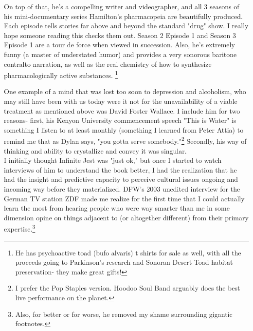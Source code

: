 On top of that, he's a compelling writer and videographer, and all 3 seasons of his mini-documentary series Hamilton's pharmacopeia are beautifully produced. Each episode tells stories far above and beyond the standard "drug" show. I really hope someone reading this checks them out. Season 2 Episode 1 and Season 3 Episode 1 are a tour de force when viewed in succession. Also, he's extremely funny (a master of understated humor) and provides a very sonorous baritone contralto narration, as well as the real chemistry of how to synthesize pharmacologically active substances. \footnote{He has psychoactive toad (bufo alvaris) t shirts for sale as well, with all the proceeds going to Parkinson's research and Sonoran Desert Toad habitat preservation- they make great gifts!}

One example of a mind that was lost too soon to depression and alcoholism, who may still have been with us today were it not for the unavailability of a viable treatment as mentioned above was David Foster Wallace. I include him for two reasons- first, his Kenyon University commencement speech "This is Water" is something I listen to at least monthly (something I learned from Peter Attia) to remind me that as Dylan says, "you gotta serve somebody."\footnote{I prefer the Pop Staples version. Hoodoo Soul Band arguably does the best live performance on the planet.} Secondly, his way of thinking and ability to crystallize and convey it was singular.\\

I initially thought Infinite Jest was "just ok," but once I started to watch interviews of him to understand the book better, I had the realization that he had the insight and predictive capacity to perceive cultural issues ongoing and incoming way before they materialized. DFW's 2003 unedited interview for the German TV station ZDF made me realize for the first time that I could actually learn the most from hearing people who were way smarter than me in some dimension opine on things adjacent to (or altogether different) from their primary expertise.\footnote{Also, for better or for worse, he removed my shame surrounding gigantic footnotes.}\\

